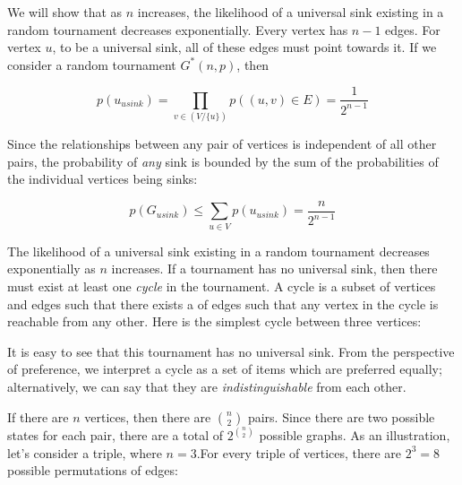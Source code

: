We will show that as $n$ increases, the likelihood of a universal sink existing in a random tournament decreases exponentially.
Every vertex has $n-1$ edges.
For vertex $u$, to be a universal sink, all of these edges must point towards it.
If we consider a random tournament $G^*(n,p)$, then

\[
p(u_{usink}) = \prod_{v \in (V / \{u\})}p((u,v) \in E) = \frac{1}{2^{n-1}}
\]

Since the relationships between any pair of vertices is independent of all other pairs, the probability of \textit{any} sink is bounded by the sum of the probabilities of the individual vertices being sinks:

\[
p(G_{usink}) \leq \sum_{u \in V}p(u_{usink}) = \frac{n}{2^{n-1}}
\]

The likelihood of a universal sink existing in a random tournament decreases exponentially as $n$ increases.
If a tournament has no universal sink, then there must exist at least one \textit{cycle} in the tournament.
A cycle is a subset of vertices and edges such that there exists a  of edges such that any vertex in the cycle is reachable from any other.
Here is the simplest cycle between three vertices:

\begin{center}
\end{center}

It is easy to see that this tournament has no universal sink.
From the perspective of preference, we interpret a cycle as a set of items which are preferred equally; alternatively, we can say that they are \textit{indistinguishable} from each other.

If there are $n$ vertices, then there are $n\choose{2}$ pairs.
Since there are two possible states for each pair, there are a total of $2^{n\choose{2}}$ possible graphs.
As an illustration, let's consider a triple, where $n = 3$.For every triple of vertices, there are $2^3 = 8$ possible permutations of edges:

